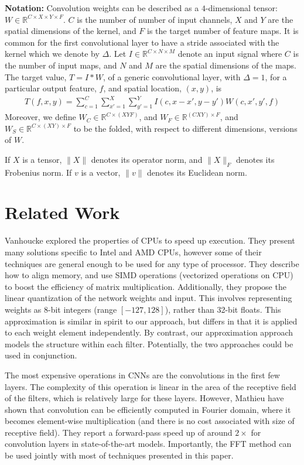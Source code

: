  \noindent \textbf{Notation:} Convolution weights can be described as
 a $4$-dimensional tensor: $W \in \mathbb{R}^{C \times X \times Y
   \times F}$. $C$ is the number of number of input channels, $X$ and
 $Y$ are the spatial dimensions of the kernel, and $F$ is the target
 number of feature maps. 
 It is common for the first convolutional layer to have a stride associated with the kernel which we denote by $\Delta$.  Let $I \in \mathbb{R}^{C \times N \times M}$
 denote an input signal where $C$ is the number of input maps, and $N$
 and $M$ are the spatial dimensions of the maps.  The target value, $T
 = I \ast W$, of a generic convolutional layer, with $\Delta = 1$, for a particular output
 feature, $f$, and spatial location, $(x, y)$, is
\begin{align*}
\label{convlayereq}
T(f,x,y) = \sum_{c=1}^C \sum_{x'=1}^{X} \sum_{y'=1}^{Y} I(c,x-x',y-y') W(c,x',y',f)
\end{align*}
Moreover, we define $W_C \in \mathbb{R}^{C \times (XYF)}$, and $W_F \in \mathbb{R}^{(CXY) \times F}$, 
and $W_S \in \mathbb{R}^{C \times (XY) \times F}$ to be the folded, with respect to different dimensions, versions of $W$.

If $X$ is a tensor, $\|X \|$ denotes its operator norm, and $\|X \|_F$ denotes its Frobenius norm.
If $v$ is a vector, $\|v \|$ denotes its Euclidean norm.

\section{Related Work}
\label{relwork}

Vanhoucke \etal \cite{vanhoucke2011improving} explored the
properties of CPUs to speed up execution.  They present many solutions
specific to Intel and AMD CPUs, however some of their techniques are
general enough to be used for any type of processor.  They describe
how to align memory, and use SIMD operations (vectorized operations on
CPU) to boost the efficiency of matrix multiplication.  Additionally, they
propose the linear quantization of the network weights and input. This
involves representing weights as 8-bit integers (range
$[-127, 128]$), rather than 32-bit floats. This approximation is
similar in spirit to our approach, but differs in that it is applied
to each weight element independently. By contrast, our approximation approach models
the structure within each filter. Potentially, the two approaches
could be used in conjunction. 

The most expensive operations in CNNs are the
convolutions in the first few layers. The complexity of this operation
is linear in the area of the receptive field of the filters, which is
relatively large for these layers.  However, Mathieu \etal \cite{mathieu2013fast} have shown that convolution can be
efficiently computed in Fourier domain, where it becomes element-wise
multiplication (and there is no cost associated with size of receptive
field). They report a forward-pass speed up of around $2\times$ for
convolution layers in state-of-the-art models. Importantly, the FFT method can
be used jointly with most of techniques presented in this paper.

